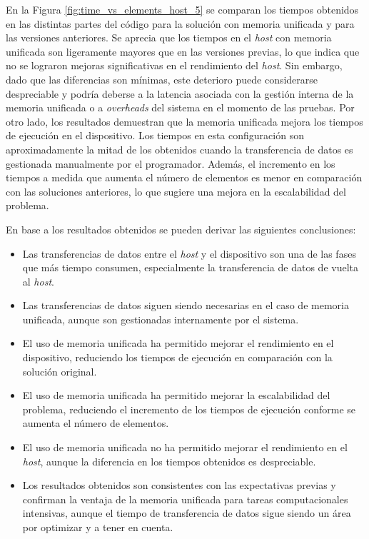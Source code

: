 \documentclass{article}
\begin{document}
			En la Figura \ref{fig:time_vs_elements_host_5} se comparan los tiempos obtenidos en las distintas partes del código para la solución con memoria unificada y para las versiones anteriores. Se aprecia que los tiempos en el \textit{host} con memoria unificada son ligeramente mayores que en las versiones previas, lo que indica que no se lograron mejoras significativas en el rendimiento del \textit{host}. Sin embargo, dado que las diferencias son mínimas, este deterioro puede considerarse despreciable y podría deberse a la latencia asociada con la gestión interna de la memoria unificada o a \textit{overheads} del sistema en el momento de las pruebas. Por otro lado, los resultados demuestran que la memoria unificada mejora los tiempos de ejecución en el dispositivo. Los tiempos en esta configuración son aproximadamente la mitad de los obtenidos cuando la transferencia de datos es gestionada manualmente por el programador. Además, el incremento en los tiempos a medida que aumenta el número de elementos es menor en comparación con las soluciones anteriores, lo que sugiere una mejora en la escalabilidad del problema.

			En base a los resultados obtenidos se pueden derivar las siguientes conclusiones:

			\begin{itemize}

				\item Las transferencias de datos entre el \textit{host} y el dispositivo son una de las fases que más tiempo consumen, especialmente la transferencia de datos de vuelta al \textit{host}.

				\item Las transferencias de datos siguen siendo necesarias en el caso de memoria unificada, aunque son gestionadas internamente por el sistema.

				\item El uso de memoria unificada ha permitido mejorar el rendimiento en el dispositivo, reduciendo los tiempos de ejecución en comparación con la solución original.

				\item El uso de memoria unificada ha permitido mejorar la escalabilidad del problema, reduciendo el incremento de los tiempos de ejecución conforme se aumenta el número de elementos.

				\item El uso de memoria unificada no ha permitido mejorar el rendimiento en el \textit{host}, aunque la diferencia en los tiempos obtenidos es despreciable.

				\item Los resultados obtenidos son consistentes con las expectativas previas y confirman la ventaja de la memoria unificada para tareas computacionales intensivas, aunque el tiempo de transferencia de datos sigue siendo un área por optimizar y a tener en cuenta.

			\end{itemize}
\end{document}
